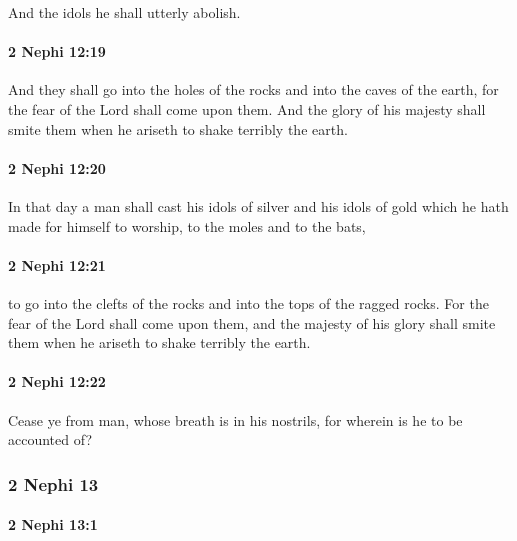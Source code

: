			And the idols he shall utterly abolish.

		\paragraph{2 Nephi 12:19} %
			\label{2NEPHI-12-19}

			And they shall go into the holes of the rocks and into the caves of the earth,
			for the fear of the Lord shall come upon them.
			And the glory of his majesty shall smite them
			when he ariseth to shake terribly the earth.

		\paragraph{2 Nephi 12:20} %
			\label{2NEPHI-12-20}

			In that day a man shall cast his idols of silver and his idols of gold
			which he hath made for himself to worship,
			to the moles and to the bats,

		\paragraph{2 Nephi 12:21} %
			\label{2NEPHI-12-21}

			to go into the clefts of the rocks and into the tops of the ragged rocks.
			For the fear of the Lord shall come upon them,
			and the majesty of his glory shall smite them
			when he ariseth to shake terribly the earth.

		\paragraph{2 Nephi 12:22} %
			\label{2NEPHI-12-22}

			Cease ye from man, whose breath is in his nostrils,
			for wherein is he to be accounted of?

	\subsubsection{2 Nephi 13} %
		\label{2NEPHI-13}
		
		\paragraph{2 Nephi 13:1} %
			\label{2NEPHI-13-1}

